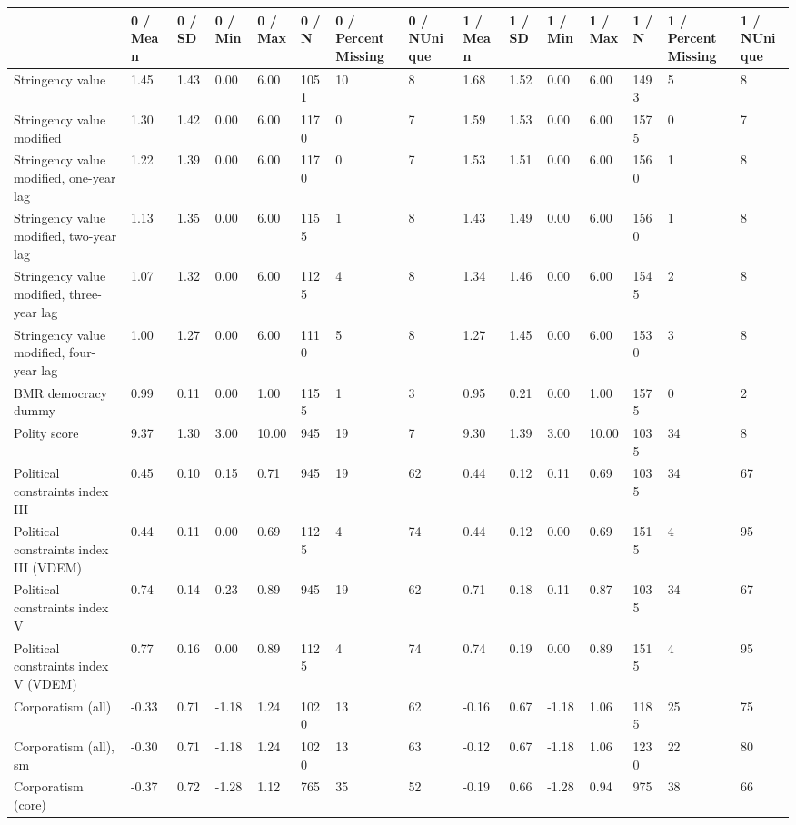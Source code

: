
\begin{longtable}{lllllllllllllll}
\toprule
  & 0 / Mean & 0 / SD & 0 / Min & 0 / Max & 0 / N & 0 / PercentMissing & 0 / NUnique & 1 / Mean & 1 / SD & 1 / Min & 1 / Max & 1 / N & 1 / PercentMissing & 1 / NUnique\\
\midrule
Stringency value & 1.45 & 1.43 & 0.00 & 6.00 & 1051 & 10 & 8 & 1.68 & 1.52 & 0.00 & 6.00 & 1493 & 5 & 8\\
Stringency value modified & 1.30 & 1.42 & 0.00 & 6.00 & 1170 & 0 & 7 & 1.59 & 1.53 & 0.00 & 6.00 & 1575 & 0 & 7\\
Stringency value modified, one-year lag & 1.22 & 1.39 & 0.00 & 6.00 & 1170 & 0 & 7 & 1.53 & 1.51 & 0.00 & 6.00 & 1560 & 1 & 8\\
Stringency value modified, two-year lag & 1.13 & 1.35 & 0.00 & 6.00 & 1155 & 1 & 8 & 1.43 & 1.49 & 0.00 & 6.00 & 1560 & 1 & 8\\
Stringency value modified, three-year lag & 1.07 & 1.32 & 0.00 & 6.00 & 1125 & 4 & 8 & 1.34 & 1.46 & 0.00 & 6.00 & 1545 & 2 & 8\\
\addlinespace
Stringency value modified, four-year lag & 1.00 & 1.27 & 0.00 & 6.00 & 1110 & 5 & 8 & 1.27 & 1.45 & 0.00 & 6.00 & 1530 & 3 & 8\\
BMR democracy dummy & 0.99 & 0.11 & 0.00 & 1.00 & 1155 & 1 & 3 & 0.95 & 0.21 & 0.00 & 1.00 & 1575 & 0 & 2\\
Polity score & 9.37 & 1.30 & 3.00 & 10.00 & 945 & 19 & 7 & 9.30 & 1.39 & 3.00 & 10.00 & 1035 & 34 & 8\\
Political constraints index III & 0.45 & 0.10 & 0.15 & 0.71 & 945 & 19 & 62 & 0.44 & 0.12 & 0.11 & 0.69 & 1035 & 34 & 67\\
Political constraints index III (VDEM) & 0.44 & 0.11 & 0.00 & 0.69 & 1125 & 4 & 74 & 0.44 & 0.12 & 0.00 & 0.69 & 1515 & 4 & 95\\
\addlinespace
Political constraints index V & 0.74 & 0.14 & 0.23 & 0.89 & 945 & 19 & 62 & 0.71 & 0.18 & 0.11 & 0.87 & 1035 & 34 & 67\\
Political constraints index V (VDEM) & 0.77 & 0.16 & 0.00 & 0.89 & 1125 & 4 & 74 & 0.74 & 0.19 & 0.00 & 0.89 & 1515 & 4 & 95\\
Corporatism (all) & -0.33 & 0.71 & -1.18 & 1.24 & 1020 & 13 & 62 & -0.16 & 0.67 & -1.18 & 1.06 & 1185 & 25 & 75\\
Corporatism (all), sm & -0.30 & 0.71 & -1.18 & 1.24 & 1020 & 13 & 63 & -0.12 & 0.67 & -1.18 & 1.06 & 1230 & 22 & 80\\
Corporatism (core) & -0.37 & 0.72 & -1.28 & 1.12 & 765 & 35 & 52 & -0.19 & 0.66 & -1.28 & 0.94 & 975 & 38 & 66\\

\end{longtable}
